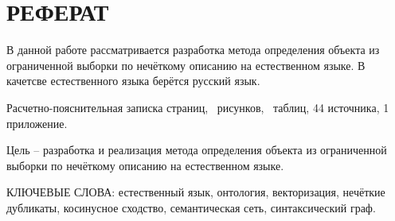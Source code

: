 \section*{РЕФЕРАТ}

В данной работе рассматривается разработка метода определения объекта из ограниченной выборки по нечёткому описанию на естественном языке. В качетсве естественного языка берётся русский язык.

Расчетно-пояснительная записка \pageref{LastPage} страниц, \totalfigures\ рисунков, \totaltables\ таблиц, 44 источника, 1 приложение.

Цель -- разработка и реализация метода определения объекта из ограниченной выборки по нечёткому описанию на естественном языке.

КЛЮЧЕВЫЕ СЛОВА: естественный язык, онтология, векторизация, нечёткие дубликаты, косинусное сходство, семантическая сеть, синтаксический граф.

\pagebreak